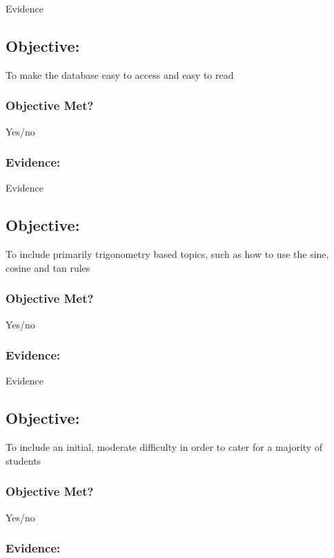 Evidence

\subsection{Objective: }

To make the database easy to access and easy to read

\subsubsection{Objective Met?}

Yes/no 

\subsubsection{Evidence: }

Evidence

\subsection{Objective: }

To include primarily trigonometry based topics, such as how to use the sine, cosine and tan rules

\subsubsection{Objective Met?}

Yes/no 

\subsubsection{Evidence: }

Evidence

\subsection{Objective: }

To include an initial, moderate difficulty in order to cater for a majority of students

\subsubsection{Objective Met?}

Yes/no 

\subsubsection{Evidence: }

